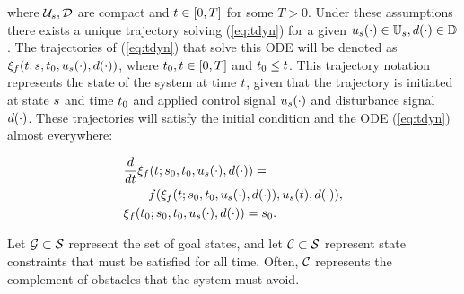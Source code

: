 \noindent where $\mathcal{U}_s, \mathcal{D}$ are compact and $t\in[0, T]$ for some $T>0$. Under these assumptions there exists a unique trajectory solving (\ref{eq:tdyn}) for a given $u_s(\cdot) \in \mathbb{U}_s, d(\cdot)\in\mathbb{D}$ \cite{Coddington84}. The trajectories of (\ref{eq:tdyn}) that solve this ODE will be denoted as $\xi_{f}(t; s, t_0, u_s(\cdot), d(\cdot))$, where $t_0,t \in [0, T]$ and $t_0 \leq t$. This trajectory notation represents the state of the system at time $t$, given that the trajectory is initiated at state $s$ and time $t_0$ and applied control signal $u_s(\cdot)$ and disturbance signal $d(\cdot)$.  These trajectories will satisfy the initial condition and the ODE (\ref{eq:tdyn}) almost everywhere:

\begin{align*}
&\frac{d}{dt}\xi_{f}(t; s_0, t_0, u_s(\cdot), d(\cdot)) = \\ &\qquad f(\xi_{f}(t; s_0, t_0, u_s(\cdot), d(\cdot)), u_s(t), d(\cdot)), \\
&\xi_{f}(t_0; s_0, t_0, u_s(\cdot), d(\cdot)) = s_0.
\end{align*}

Let $\mathcal G \subset \mathcal{S}$ represent the set of goal states, and let $\mathcal C \subset \mathcal{S}$ represent state constraints that must be satisfied for all time.
Often, $\mathcal C$ represents the complement of obstacles that the system must avoid.


